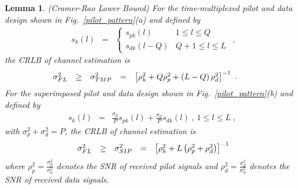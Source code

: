 \documentclass[10pt,fleqn, twocolumn]{IEEEtran}
\newtheorem{lemma}{Lemma}
\begin{document}
\begin{lemma}\label{Lemma_CRLB}(Cramer-Rao Lower Bound) For the time-multiplexed pilot and data design shown in Fig.~\ref{pilot_pattern}(a) and defined by
\begin{equation}
\begin{array}{rcl}
s_{k}\left(l\right)&=&
\begin{cases}
s_{pk}(l) & 1 \leq l \leq Q \\
s_{dk}(l-Q) & Q+1\leq l\leq L
\end{cases}
\end{array},\label{TMP_k}
\end{equation}
\noindent the CRLB of channel estimation is
\begin{equation}\hspace{-0.3in}
\begin{array}{rcccl}
\sigma_{\mbox{\tiny FL}}^{2}&\geq&\sigma_{\mbox{\tiny
TMP}}^{2}&=&\left[\rho_{h}^2+Q\rho_{p}^2+\left(L-Q\right)\rho_{d}^2\right]^{-1}
\end{array}.\label{CRLB_TMP}
\end{equation}
\noindent For the superimposed pilot and data design shown in
Fig.~\ref{pilot_pattern}(b) and defined by
\begin{equation}
\begin{array}{rcl}
s_{k}\left(l\right)&=&\frac{\sigma_{p}}{P}s_{pk}\left(l\right)+\frac{\sigma_{d}}{P}s_{dk}\left(l\right)\
,\ 1\leq l\leq L\ ,
\end{array}\label{SIP_k}
\end{equation}
\noindent with $\sigma_{p}^2+\sigma_{d}^2=P$, the CRLB of channel
estimation is
\begin{equation}\
\begin{array}{rcccl}
\sigma_{\mbox{\tiny FL}}^{2}&\geq&\sigma_{\mbox{\tiny
SIP}}^{2}&=&\left[\rho_{h}^2+L\left(\rho_{p}^2+\rho_{d}^2\right)\right]^{-1}
\end{array}\label{CRLB_SIP}
\end{equation}
\noindent where $\rho_{p}^2=\frac{\sigma_{p}^2}{\sigma_{n}^2}$
denotes the SNR of received pilot signals and
$\rho_{d}^2=\frac{\sigma_{d}^2}{\sigma_{n}^2}$ denotes the SNR of
received data signals.
\end{lemma}
\end{document}
